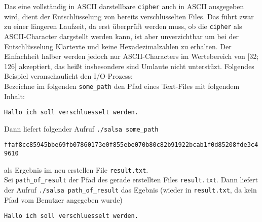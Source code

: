 \documentclass[course=erap]{aspdoc}
\begin{document}
Das eine vollständig in ASCII darstellbare \texttt{cipher} auch in ASCII ausgegeben wird, dient der Entschlüsselung von bereits verschlüsselten Files.
Das führt zwar zu einer längeren Laufzeit, da erst überprüft werden muss, ob die \texttt{cipher} als ASCII-Character dargstellt werden kann, ist aber unverzichtbar um bei der Entschlüsselung Klartexte und keine Hexadezimalzahlen zu erhalten.
Der Einfachheit halber werden jedoch nur ASCII-Characters im Wertebereich von [32; 126] akzeptiert, das heißt insbesondere sind Umlaute nicht unterstüzt.
Folgendes Beispiel veranschaulicht den I/O-Prozess:
\vspace{5mm}
\\Bezeichne im folgenden \texttt{some\_path} den Pfad eines Text-Files mit folgendem Inhalt:
\begin{center}
    \texttt{Hallo ich soll verschluesselt werden.}
\end{center}
Dann liefert folgender Aufruf \texttt{./salsa some\_path}
\begin{center}
    \small{\texttt{ffaf8cc85945bbe69fb07860173e0f855ebe070b80c82b91922bcab1f0d85208fde3c49610}}
\end{center}
als Ergebnis im neu erstellen File \texttt{result.txt}.
\vspace{5mm}
\\Sei \texttt{path\_of\_result} der Pfad des gerade erstellten Files \texttt{result.txt}. Dann liefert der Aufruf \texttt{./salsa path\_of\_result}
das Egebnis (wieder in \texttt{result.txt}, da kein Pfad vom Benutzer angegeben wurde)
\begin{center}
    \texttt{Hallo ich soll verschluesselt werden.}
\end{center}
\end{document}
